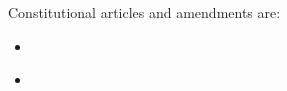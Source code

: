 \documentclass[english]{article}
\begin{document}
Constitutional articles and amendments are:

\begin{itemize}
\item \cite{constarticle}
\item \cite{constamend}
\end{itemize}

\printbibliography
\end{document}
